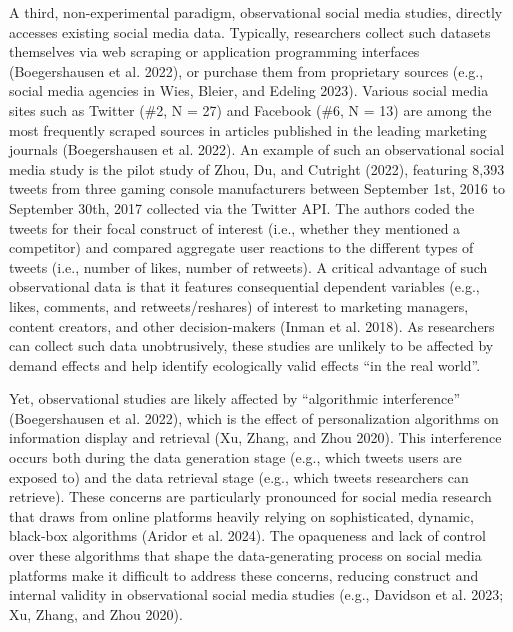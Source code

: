 \documentclass[
  a4paper,
]{scrreprt}
\begin{document}
A third, non-experimental paradigm, observational social media studies,
directly accesses existing social media data. Typically, researchers
collect such datasets themselves via web scraping or application
programming interfaces (Boegershausen et al. 2022), or purchase them
from proprietary sources (e.g., social media agencies in Wies, Bleier,
and Edeling 2023). Various social media sites such as Twitter (\#2, N =
27) and Facebook (\#6, N = 13) are among the most frequently scraped
sources in articles published in the leading marketing journals
(Boegershausen et al. 2022). An example of such an observational social
media study is the pilot study of Zhou, Du, and Cutright (2022),
featuring 8,393 tweets from three gaming console manufacturers between
September 1st, 2016 to September 30th, 2017 collected via the Twitter
API. The authors coded the tweets for their focal construct of interest
(i.e., whether they mentioned a competitor) and compared aggregate user
reactions to the different types of tweets (i.e., number of likes,
number of retweets). A critical advantage of such observational data is
that it features consequential dependent variables (e.g., likes,
comments, and retweets/reshares) of interest to marketing managers,
content creators, and other decision-makers (Inman et al. 2018). As
researchers can collect such data unobtrusively, these studies are
unlikely to be affected by demand effects and help identify ecologically
valid effects ``in the real world''.

Yet, observational studies are likely affected by ``algorithmic
interference'' (Boegershausen et al. 2022), which is the effect of
personalization algorithms on information display and retrieval (Xu,
Zhang, and Zhou 2020). This interference occurs both during the data
generation stage (e.g., which tweets users are exposed to) and the data
retrieval stage (e.g., which tweets researchers can retrieve). These
concerns are particularly pronounced for social media research that
draws from online platforms heavily relying on sophisticated, dynamic,
black-box algorithms (Aridor et al. 2024). The opaqueness and lack of
control over these algorithms that shape the data-generating process on
social media platforms make it difficult to address these concerns,
reducing construct and internal validity in observational social media
studies (e.g., Davidson et al. 2023; Xu, Zhang, and Zhou 2020).
\end{document}
